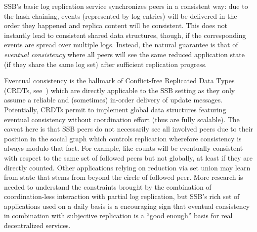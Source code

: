 \documentclass[10pt,sigconf]{acmart}
\begin{document}
SSB's basic log replication service synchronizes peers in a consistent
way: due to the hash chaining, events (represented by log entries)
will be delivered in the order they happened and replica content will
be consistent. This does not instantly lead to consistent shared data
structures, though, if the corresponding events are spread over
multiple logs. Instead, the natural guarantee is that of {\em eventual
  consistency} where all peers will see the same reduced application
state (if they share the same log set) after sufficient replication
progress.

Eventual consistency is the hallmark of Conflict-free Replicated Data
Types (CRDTs, see~\cite{}) which are directly applicable to the SSB
setting as they only assume a reliable and (sometimes) in-order
delivery of update messages. Potentially, CRDTs permit to implement
global data structures featuring eventual consistency without
coordination effort (thus are fully scalable). The caveat here is that
SSB peers do not necessarily see all involved peers due to their
position in the social graph which controls replication wherefore
consistency is always modulo that fact. For example, like counts will
be eventually consistent with respect to the same set of followed
peers but not globally, at least if they are directly counted. Other
applications relying on reduction via set union may learn from state
that stems from beyond the circle of followed peer. More research is
needed to understand the constraints brought by the combination of
coordination-less interaction with partial log replication, but SSB's
rich set of applications used on a daily basis is a encouraging sign
that eventual consistency in combination with subjective replication
is a ``good enough'' basis for real decentralized services.




\end{document}
